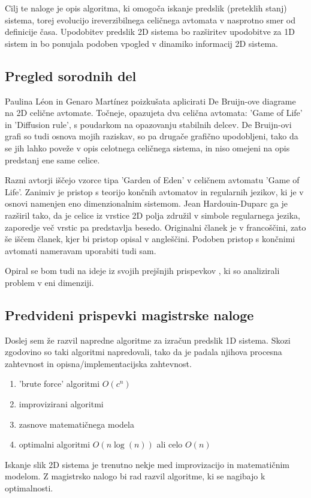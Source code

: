 \documentclass[a4paper, 12pt]{article}
\begin{document}
Cilj te naloge je opis algoritma, ki omogoča iskanje predslik (preteklih stanj) sistema, torej evolucijo
ireverzibilnega celičnega avtomata v nasprotno smer od definicije časa.
Upodobitev predslik 2D sistema bo razširitev upodobitve za 1D sistem
in bo ponujala podoben vpogled v dinamiko informacij 2D sistema.

\subsection{Pregled sorodnih del}

Paulina Léon in Genaro Martínez \cite{PaulinaGenaro2016} poizkušata aplicirati
De Bruijn-ove diagrame na 2D celične avtomate. Točneje, opazujeta dva celična avtomata:
'Game of Life' in 'Diffusion rule', s poudarkom na opazovanju stabilnih delcev.
De Bruijn-ovi grafi so tudi osnova mojih raziskav, so pa drugače grafično upodobljeni,
tako da se jih lahko poveže v opis celotnega celičnega sistema, in niso omejeni na
opis predstanj ene same celice.

Razni avtorji \cite{Hartman2013} iščejo vzorce tipa 'Garden of Eden' v celičnem avtomatu 'Game of Life'.
Zanimiv je pristop s teorijo končnih avtomatov in regularnih jezikov, ki je v
osnovi namenjen eno dimenzionalnim sistemom. Jean Hardouin-Duparc ga je razširil
tako, da je celice iz vrstice 2D polja združil v simbole regularnega jezika, zaporedje več
vrstic pa predstavlja besedo. Originalni članek je v francoščini, zato še iščem članek,
kjer bi pristop opisal v angleščini. Podoben pristop s končnimi avtomati nameravam uporabiti tudi sam.

Opiral se bom tudi na ideje iz svojih prejšnjih prispevkov \cite{JerasDobnikar2007}
\cite{DBLP:conf/iccS/JerasD06} \cite{DBLP:conf/automata/Jeras08},
ki so analizirali problem v eni dimenziji.

\subsection{Predvideni prispevki magistrske naloge}

Doslej sem že razvil napredne algoritme za izračun predslik 1D sistema.
Skozi zgodovino so taki algoritmi napredovali, tako da je padala njihova
procesna zahtevnost in opisna/implementacijska zahtevnost.
\begin{enumerate}
\item 'brute force' algoritmi \( O(c^n) \)
\item improvizirani algoritmi
\item zasnove matematičnega modela
\item optimalni algoritmi \( O(n \log(n)) \) ali celo \( O(n) \)
\end{enumerate}
Iskanje slik 2D sistema je trenutno nekje med improvizacijo in matematičnim modelom.
Z magistrsko nalogo bi rad razvil algoritme, ki se nagibajo k optimalnosti.
\end{document}
